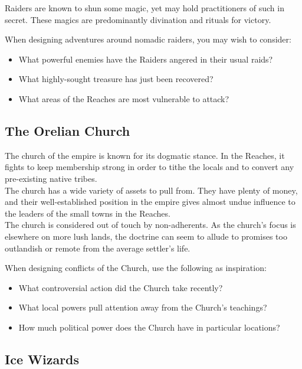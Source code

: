 \documentclass[notitlepage]{article}
\begin{document}
\begin{multicols}{2}
  Raiders are known to shun some magic, yet may hold practitioners of such in secret. These magics are predominantly divination and rituals for victory.

  When designing adventures around nomadic raiders, you may wish to consider:

  \begin{itemize}
  \item What powerful enemies have the Raiders angered in their usual raids?
  \item What highly-sought treasure has just been recovered?
  \item What areas of the Reaches are most vulnerable to attack?
  \end{itemize}

  \subsection*{The Orelian Church}

  The church of the empire is known for its dogmatic stance.
  In the Reaches, it fights to keep membership strong in order to tithe the locals and to convert any pre-existing native tribes. \\
  
  The church has a wide variety of assets to pull from.
  They have plenty of money, and their well-established position in the empire gives almost undue influence to the leaders of the small towns in the Reaches. \\

  The church is considered out of touch by non-adherents.
  As the church's focus is elsewhere on more lush lands, the doctrine can seem to allude to promises too outlandish or remote from the average settler's life.

  When designing conflicts of the Church, use the following as inspiration:

  \begin{itemize}
  \item What controversial action did the Church take recently?
  \item What local powers pull attention away from the Church's teachings?
  \item How much political power does the Church have in particular locations?
  \end{itemize}

  \subsection*{Ice Wizards}


\end{multicols}
\end{document}
